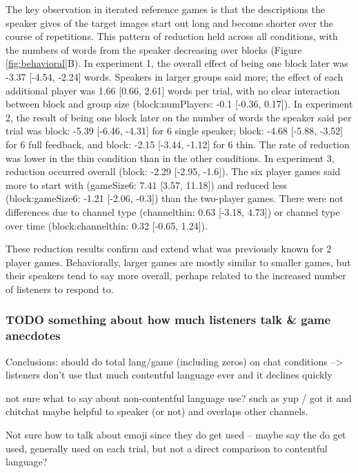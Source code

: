 \documentclass[
  english,
  a4paper,
]{article}
\begin{document}
The key observation in iterated reference games is that the descriptions the speaker gives of the target images start out long and become shorter over the course of repetitions. This pattern of reduction held across all conditions, with the numbers of words from the speaker decreasing over blocks (Figure \ref{fig:behavioral}B). In experiment 1, the overall effect of being one block later was -3.37 {[}-4.54, -2.24{]} words. Speakers in larger groups said more; the effect of each additional player was 1.66 {[}0.66, 2.61{]} words per trial, with no clear interaction between block and group size (block:numPlayers: -0.1 {[}-0.36, 0.17{]}). In experiment 2, the result of being one block later on the number of words the speaker said per trial was block: -5.39 {[}-6.46, -4.31{]} for 6 single speaker; block: -4.68 {[}-5.88, -3.52{]} for 6 full feedback, and block: -2.15 {[}-3.44, -1.12{]} for 6 thin. The rate of reduction was lower in the thin condition than in the other conditions. In experiment 3, reduction occurred overall (block: -2.29 {[}-2.95, -1.6{]}). The six player games said more to start with (gameSize6: 7.41 {[}3.57, 11.18{]}) and reduced less (block:gameSize6: -1.21 {[}-2.06, -0.3{]}) than the two-player games. There were not differences due to channel type (channelthin: 0.63 {[}-3.18, 4.73{]}) or channel type over time (block:channelthin: 0.32 {[}-0.65, 1.24{]}).

These reduction results confirm and extend what was previously known for 2 player games. Behaviorally, larger games are mostly similar to smaller games, but their speakers tend to say more overall, perhaps related to the increased number of listeners to respond to.

\hypertarget{todo-something-about-how-much-listeners-talk-game-anecdotes}{%
\subsubsection{TODO something about how much listeners talk \& game anecdotes}\label{todo-something-about-how-much-listeners-talk-game-anecdotes}}

Conclusions:
should do total lang/game (including zeros) on chat conditions --\textgreater{} listeners don't use that much contentful language ever and it declines quickly

not sure what to say about non-contentful language use? such as yup / got it and chitchat maybe helpful to speaker (or not) and overlaps other channels.

Not sure how to talk about emoji since they do get used -- maybe say the do get used, generally used on each trial, but not a direct comparison to contentful language?
\end{document}
